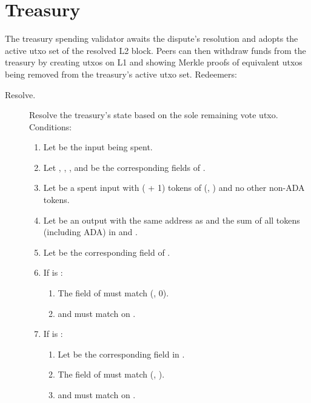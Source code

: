 \documentclass[../hydrozoa.tex]{subfiles}
\begin{document}
\section{Treasury}%
\label{h:l1-rule-based-treasury}%

The treasury spending validator awaits the dispute's resolution and adopts the active utxo set of the resolved L2 block.
Peers can then withdraw funds from the treasury by creating utxos on L1 and showing Merkle proofs of equivalent utxos being removed from the treasury's active utxo set.
Redeemers:
\begin{description}
  \item[Resolve.] Resolve the treasury's state based on the sole remaining vote utxo.
    Conditions:
    \begin{enumerate}
      \item Let  be the input being spent.
      \item Let , , , and  be the corresponding fields of .
      \item Let  be a spent input with ( + 1) tokens of (, ) and no other non-ADA tokens.
      \item Let  be an output with the same address as  and the sum of all tokens (including ADA) in  and .
      \item Let  be the corresponding field of .
      \item If  is :
        \begin{enumerate}
          \item The  field of  must match (, 0).
          \item {} and  must match on .
        \end{enumerate}
      \item If  is :
        \begin{enumerate}
          \item Let  be the corresponding field in .
          \item The  field of  must match (, ).
          \item {} and  must match on .

\end{enumerate}
\end{enumerate}
\end{description}
\end{document}
